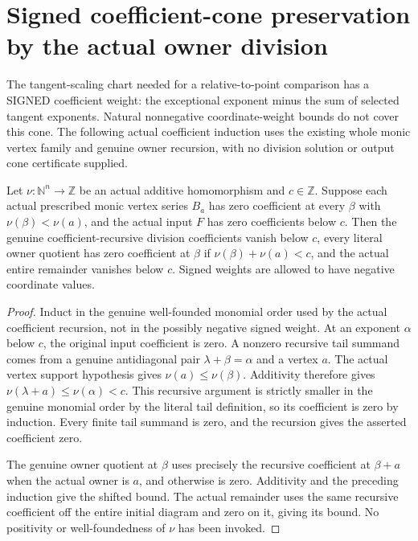 \section{Signed coefficient-cone preservation by the actual owner division}

The tangent-scaling chart needed for a relative-to-point comparison has a
SIGNED coefficient weight: the exceptional exponent minus the sum of selected
tangent exponents. Natural nonnegative coordinate-weight bounds do not cover
this cone. The following actual coefficient induction uses the existing
whole monic vertex family and genuine owner recursion, with no division
solution or output cone certificate supplied.

\begin{theorem}
\label{hir:actual-family-division-signed-coefficient-bound}
\leanok
Let $\nu:\mathbb N^n\to\mathbb Z$ be an actual additive homomorphism and
$c\in\mathbb Z$. Suppose each actual prescribed monic vertex series $B_a$
has zero coefficient at every $\beta$ with $\nu(\beta)<\nu(a)$, and the
actual input $F$ has zero coefficients below $c$. Then the genuine
coefficient-recursive division coefficients vanish below $c$, every literal
owner quotient has zero coefficient at $\beta$ if $\nu(\beta)+\nu(a)<c$,
and the actual entire remainder vanishes below $c$. Signed weights are
allowed to have negative coordinate values.
\end{theorem}
\begin{proof}
Induct in the genuine well-founded monomial order used by the actual
coefficient recursion, not in the possibly negative signed weight.
At an exponent $\alpha$ below $c$, the original input coefficient is zero.
A nonzero recursive tail summand comes from a genuine antidiagonal pair
$\lambda+\beta=\alpha$ and a vertex $a$. The actual vertex support
hypothesis gives $\nu(a)\le\nu(\beta)$. Additivity therefore gives
$\nu(\lambda+a)\le\nu(\alpha)<c$. This recursive argument is strictly
smaller in the genuine monomial order by the literal tail definition, so
its coefficient is zero by induction. Every finite tail summand is zero,
and the recursion gives the asserted coefficient zero.

The genuine owner quotient at $\beta$ uses precisely the recursive
coefficient at $\beta+a$ when the actual owner is $a$, and otherwise is
zero. Additivity and the preceding induction give the shifted bound.
The actual remainder uses the same recursive coefficient off the entire
initial diagram and zero on it, giving its bound. No positivity or
well-foundedness of $\nu$ has been invoked.
\end{proof}

